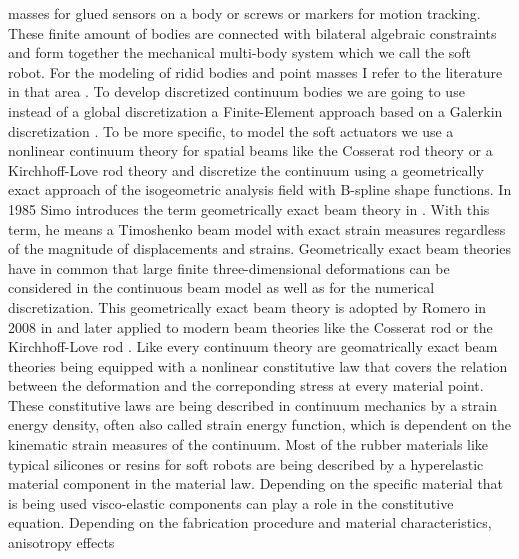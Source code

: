   masses for glued sensors on a body or screws or markers for motion tracking. These finite amount of bodies are connected with bilateral algebraic constraints and form together
  the mechanical multi-body system which we call the soft robot. For the modeling of ridid bodies and point masses I refer to the literature in that area \cite{Glocker2001_book}.
  To develop discretized continuum bodies we are going to use instead of a global discretization a Finite-Element approach based on a Galerkin discretization \cite{Harsch2021a}.
  To be more specific, to model the soft actuators we use a nonlinear continuum theory for spatial beams like the Cosserat rod theory \cite{Rubin2013_book} or a Kirchhoff-Love rod theory \cite{Meier2016_diss}
   and discretize the continuum using a geometrically exact approach of the isogeometric analysis field with B-spline shape functions.
In 1985 Simo introduces the term geometrically exact beam theory in \cite{Simo1985, Simo1986}. With this term, he means a Timoshenko beam model with exact strain measures regardless
 of the magnitude of displacements and strains. Geometrically exact beam theories have in common that large finite three-dimensional deformations can be considered in the continuous
 beam model as well as for the numerical discretization. This geometrically exact beam theory is adopted by Romero in 2008 in \cite{Romero2008} and later applied to modern beam theories
 like the Cosserat rod \cite{Eugster2014_diss, Caasenbrood2021_conf} or the Kirchhoff-Love rod \cite{Meier2017}.
%
Like every continuum theory are geomatrically exact beam theories being equipped with a nonlinear constitutive law that covers the relation between the deformation and the correponding stress
at every material point. 
These constitutive laws are being described in continuum mechanics by a strain energy density, often also called strain energy function, which is dependent on the kinematic strain measures
of the continuum. Most of the rubber materials like typical silicones or resins for soft robots are being described by a hyperelastic material component in the material law. Depending
on the specific material that is being used visco-elastic components can play a role in the constitutive equation. Depending on the fabrication procedure and material characteristics, anisotropy effects
